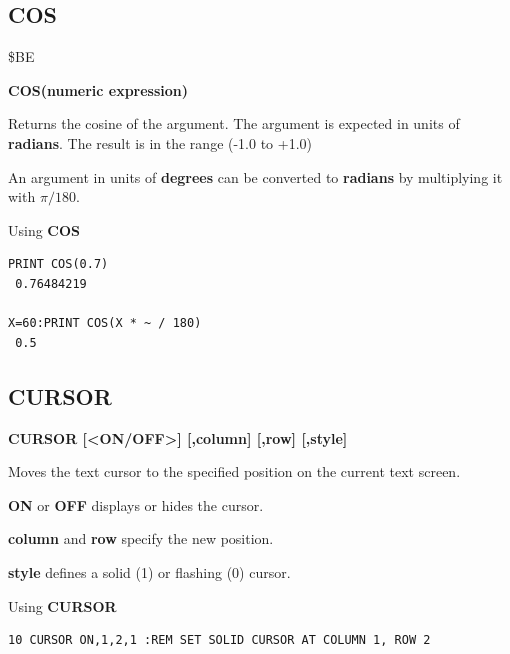 
\newpage
\subsection{COS}
\begin{description}[leftmargin=2cm,style=nextline]
\item [Token:] \$BE
\item [Format:] {\bf COS(numeric expression)}
\item [Usage:] Returns the cosine of the argument.
               The argument is expected in units of {\bf radians}.
               The result is in the range (-1.0 to +1.0)

\item [Remarks:] An argument in units of {\bf degrees}
                 can be converted to {\bf radians}
               by multiplying it with $\pi/180$.
\item [Examples:] Using {\bf COS}
\begin{tcolorbox}[colback=black,coltext=white]
\verbatimfont{\codefont}
\begin{verbatim}
PRINT COS(0.7)
 0.76484219

X=60:PRINT COS(X * ~ / 180)
 0.5
\end{verbatim}
\end{tcolorbox}
\end{description}


\newpage
\subsection{CURSOR}
\begin{description}[leftmargin=2cm,style=nextline]
\item [Format:] {\bf CURSOR [<ON/OFF>] [,column] [,row] [,style]}
\item [Usage:] Moves the text cursor to
               the specified position on the current text screen.

               {\bf ON} or {\bf OFF} displays or hides the cursor.

               {\bf column} and {\bf row} specify the new position.

               {\bf style} defines a solid (1) or flashing (0) cursor.

\item [Example:] Using {\bf CURSOR}
\begin{tcolorbox}[colback=black,coltext=white]
\verbatimfont{\codefont}
\begin{verbatim}
10 CURSOR ON,1,2,1 :REM SET SOLID CURSOR AT COLUMN 1, ROW 2
\end{verbatim}
\end{tcolorbox}
\end{description}

